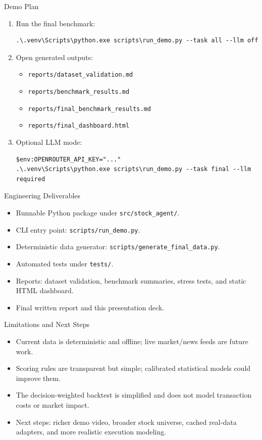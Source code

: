\documentclass[aspectratio=169]{beamer}
\begin{document}
\begin{frame}[fragile]{Demo Plan}
  \begin{enumerate}
    \item Run the final benchmark:
{\scriptsize
\begin{verbatim}
.\.venv\Scripts\python.exe scripts\run_demo.py --task all --llm off
\end{verbatim}
}
    \item Open generated outputs:
      \begin{itemize}
        \item \texttt{reports/dataset\_validation.md}
        \item \texttt{reports/benchmark\_results.md}
        \item \texttt{reports/final\_benchmark\_results.md}
        \item \texttt{reports/final\_dashboard.html}
      \end{itemize}
    \item Optional LLM mode:
{\scriptsize
\begin{verbatim}
$env:OPENROUTER_API_KEY="..."
.\.venv\Scripts\python.exe scripts\run_demo.py --task final --llm required
\end{verbatim}
}
  \end{enumerate}
\end{frame}

\begin{frame}{Engineering Deliverables}
  \begin{itemize}
    \item Runnable Python package under \texttt{src/stock\_agent/}.
    \item CLI entry point: \texttt{scripts/run\_demo.py}.
    \item Deterministic data generator: \texttt{scripts/generate\_final\_data.py}.
    \item Automated tests under \texttt{tests/}.
    \item Reports: dataset validation, benchmark summaries, stress tests, and static HTML dashboard.
    \item Final written report and this presentation deck.
  \end{itemize}
\end{frame}

\begin{frame}{Limitations and Next Steps}
  \begin{itemize}
    \item Current data is deterministic and offline; live market/news feeds are future work.
    \item Scoring rules are transparent but simple; calibrated statistical models could improve them.
    \item The decision-weighted backtest is simplified and does not model transaction costs or market impact.
    \item Next steps: richer demo video, broader stock universe, cached real-data adapters, and more realistic execution modeling.
  \end{itemize}
\end{frame}
\end{document}
